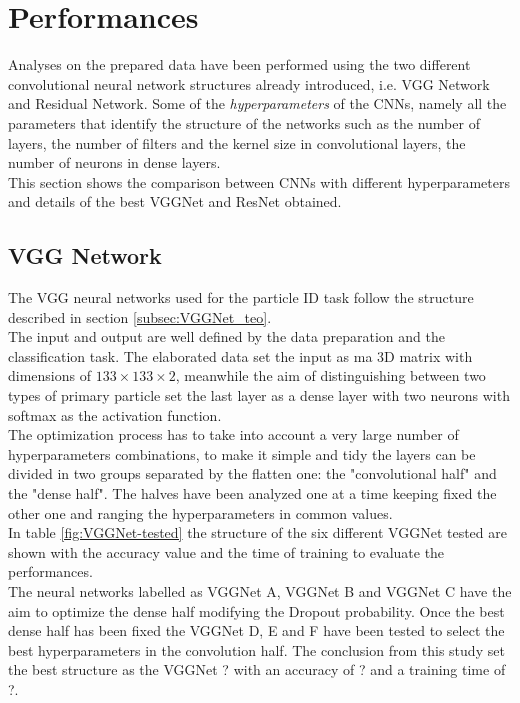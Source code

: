 \section{Performances}\label{sec:NN_perf}
Analyses on the prepared data have been performed using the two different convolutional neural network structures already introduced, i.e. VGG Network and Residual Network. Some of the \textit{hyperparameters} of the CNNs, namely all the parameters that identify the structure of the networks such as the number of layers, the number of filters and the kernel size in convolutional layers, the number of neurons in dense layers.\\
This section shows the comparison between CNNs with different hyperparameters and details of the best VGGNet and ResNet obtained.

\subsection{VGG Network}
The VGG neural networks used for the particle ID task follow the structure described in section \ref{subsec:VGGNet_teo}.\\
The input and output are well defined by the data preparation and the classification task. The elaborated data set the input as ma 3D matrix with dimensions of $133\times 133\times 2$, meanwhile the aim of distinguishing between two types of primary particle set the last layer as a dense layer with two neurons with softmax as the activation function.\\
The optimization process has to take into account a very large number of hyperparameters combinations, to make it simple and tidy the layers can be divided in two groups separated by the flatten one: the "convolutional half" and the "dense half". The halves have been analyzed one at a time keeping fixed the other one and ranging the hyperparameters in common values.\\
In table \ref{fig:VGGNet-tested} the structure of the six different VGGNet tested are shown with the accuracy value and the time of training to evaluate the performances.\\
The neural networks labelled as VGGNet A, VGGNet B and VGGNet C have the aim to optimize the dense half modifying the Dropout probability. Once the best dense half has been fixed the VGGNet D, E and F have been tested to select the best hyperparameters in the convolution half. The conclusion from this study set the best structure as the VGGNet ? with an accuracy of ? and a training time of ?.\\

